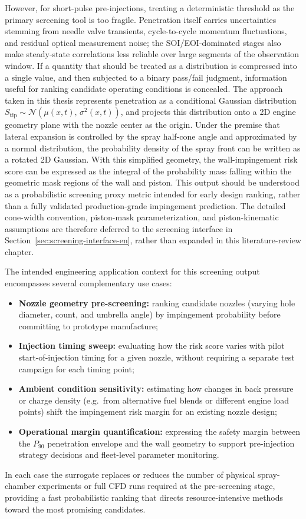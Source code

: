 However, for short-pulse pre-injections, treating a deterministic threshold as the primary screening tool is too fragile.
Penetration itself carries uncertainties stemming from needle valve transients, cycle-to-cycle momentum fluctuations, and residual optical measurement noise; the SOI/EOI-dominated stages also make steady-state correlations less reliable over large segments of the observation window.
If a quantity that should be treated as a distribution is compressed into a single value, and then subjected to a binary pass/fail judgment, information useful for ranking candidate operating conditions is concealed.
The approach taken in this thesis represents penetration as a conditional Gaussian distribution \(S_\mathrm{tip}\sim\mathcal{N}(\mu(x,t),\,\sigma^2(x,t))\), and projects this distribution onto a 2D engine geometry plane with the nozzle center as the origin.
Under the premise that lateral expansion is controlled by the spray half-cone angle and approximated by a normal distribution, the probability density of the spray front can be written as a rotated 2D Gaussian.
With this simplified geometry, the wall-impingement risk score can be expressed as the integral of the probability mass falling within the geometric mask regions of the wall and piston.
This output should be understood as a probabilistic screening proxy metric intended for early design ranking, rather than a fully validated production-grade impingement prediction.
The detailed cone-width convention, piston-mask parameterization, and piston-kinematic assumptions are therefore deferred to the screening interface in Section~\ref{sec:screening-interface-en}, rather than expanded in this literature-review chapter.

The intended engineering application context for this screening output encompasses several complementary use cases:
\begin{itemize}
  \item \textbf{Nozzle geometry pre-screening:} ranking candidate nozzles (varying hole diameter, count, and umbrella angle) by impingement probability before committing to prototype manufacture;
  \item \textbf{Injection timing sweep:} evaluating how the risk score varies with pilot start-of-injection timing for a given nozzle, without requiring a separate test campaign for each timing point;
  \item \textbf{Ambient condition sensitivity:} estimating how changes in back pressure or charge density (e.g.\ from alternative fuel blends or different engine load points) shift the impingement risk margin for an existing nozzle design;
  \item \textbf{Operational margin quantification:} expressing the safety margin between the $P_{90}$ penetration envelope and the wall geometry to support pre-injection strategy decisions and fleet-level parameter monitoring.
\end{itemize}
In each case the surrogate replaces or reduces the number of physical spray-chamber experiments or full CFD runs required at the pre-screening stage, providing a fast probabilistic ranking that directs resource-intensive methods toward the most promising candidates.

